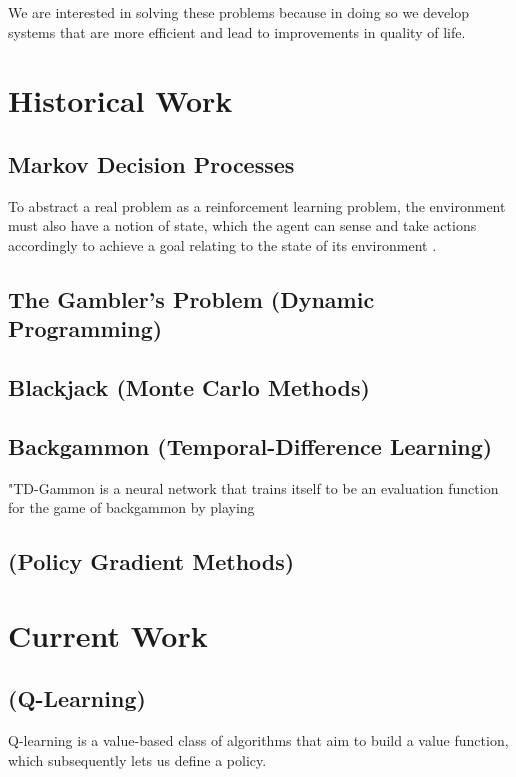 \documentclass{article}
\begin{document}
We are interested in solving these problems because in doing so we
develop systems that are more efficient and lead to improvements in
quality of life.

\section{Historical Work}

\subsection{Markov Decision Processes}

To abstract a real problem as a reinforcement learning problem, the environment 
must also have a notion of state, which the agent can sense and take actions accordingly to achieve a goal 
relating to the state of its environment \cite{Sutton1998}.

\subsection{The Gambler's Problem (Dynamic Programming)}

\subsection{Blackjack (Monte Carlo Methods)}

\subsection{Backgammon (Temporal-Difference Learning)}

"TD-Gammon is a neural network that trains itself to be an evaluation function for the game of backgammon by playing 

\subsection{(Policy Gradient Methods)}

\section{Current Work}

\subsection{(Q-Learning)}
Q-learning is a value-based class of algorithms that aim to build a value function, which subsequently lets us define a policy.
\end{document}
